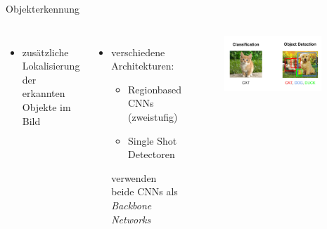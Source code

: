 \begin{frame}{Objekterkennung}

    \begin{columns}[T]

        \begin{itemize}
            \item zusätzliche Lokalisierung der erkannten Objekte im Bild
        \end{itemize}
        \begin{itemize}
            \item verschiedene Architekturen: 
            \begin{itemize}
                \item Regionbased CNNs (zweistufig)
                \item Single Shot Detectoren
            \end{itemize}
            verwenden beide CNNs als \textit{Backbone Networks}
        \end{itemize}


        \begin{figure}
            \centering
            \includegraphics[width=0.9\textwidth]{Bilder/classification_detection.jpeg}
        \end{figure}
        
    \end{columns}

    \vspace{0.5cm}
\end{frame}
